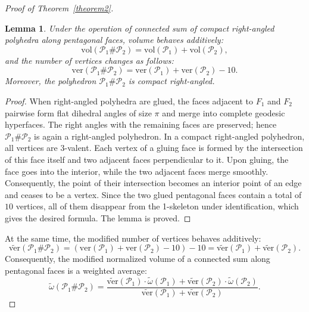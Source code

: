 \documentclass{amsart}
\newtheorem{lemma}{Lemma}[section]
\newcommand{\vol}{\mathrm{vol}}
\newcommand{\tomega}{\widetilde{\omega}}
\newcommand{\tN}{\widetilde{\ver}}
\newcommand{\ver}{\mathrm{ver}}
\begin{document}
\begin{proof}[Proof of Theorem~\ref{theorem2}]
	\begin{lemma} \label{lemma5.1}
		Under the operation of connected sum of compact right-angled polyhedra along pentagonal faces, volume behaves additively: 
		$$ 
		\vol (\mathcal P_1 \# \mathcal P_2) = \vol (\mathcal P_1) + \vol (\mathcal P_2), 
		$$ 
		and the number of vertices changes as follows: 
		$$ 
		\ver(\mathcal P_1 \# \mathcal P_2) = \ver(\mathcal P_1) + \ver(\mathcal P_2) - 10. 
		$$
		Moreover, the polyhedron $\mathcal P_1 \# \mathcal P_2$ is compact right-angled.
	\end{lemma}
\begin{proof}
		When right-angled polyhedra are glued, the faces adjacent to $F_1$ and $F_2$ pairwise form flat dihedral angles of size $\pi$ and merge into complete geodesic hyperfaces. The right angles with the remaining faces are preserved; hence $\mathcal P_1 \# \mathcal P_2$ is again a right-angled polyhedron.
		In a compact right-angled polyhedron, all vertices are 3-valent. Each vertex of a gluing face is formed by the intersection of this face itself and two adjacent faces perpendicular to it. Upon gluing, the face goes into the interior, while the two adjacent faces merge smoothly. Consequently, the point of their intersection becomes an interior point of an edge and ceases to be a vertex. Since the two glued pentagonal faces contain a total of $10$ vertices, all of them disappear from the 1-skeleton under identification, which gives the desired formula. The lemma is proved.
\end{proof}

	At the same time, the modified number of vertices behaves additively:  
	$$ 
	\tN(\mathcal P_1 \# \mathcal P_2) = (\ver(\mathcal P_1) + \ver(\mathcal P_2) - 10) - 10 = \tN(\mathcal P_1) + \tN(\mathcal P_2).
	$$
		Consequently, the modified normalized volume of a connected sum along pentagonal faces is a weighted average:
	\begin{equation}
		\tomega(\mathcal P_1 \# \mathcal P_2) = \frac{\tN(\mathcal P_1) \cdot \tomega(\mathcal P_1) + \tN(\mathcal P_2) \cdot \tomega(\mathcal P_2)}{\tN(\mathcal P_1) + \tN(\mathcal P_2)}.
	\end{equation}
	

\end{proof}
\end{document}

